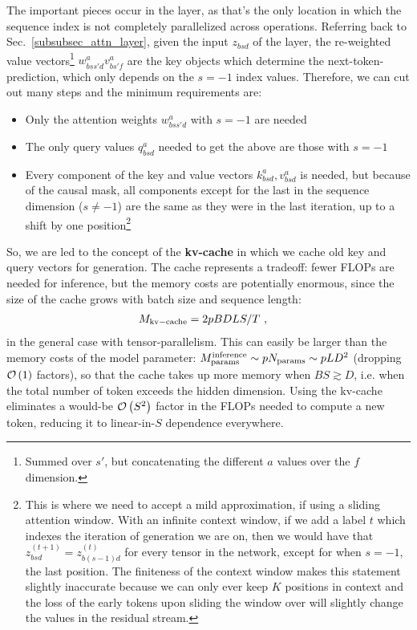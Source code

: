 The important pieces occur in the  layer, as that's the only location in
which the sequence index is not completely parallelized across operations. Referring back to
Sec.~\ref{subsubsec_attn_layer}, given the input $ z _{ bsd } $ of the 
layer, the re-weighted value vectors\footnote{Summed over $ s' $, but concatenating the different $
		a $ values over the $ f $ dimension.} $ w ^{ a }_{ bss'd } v ^{ a } _{ bs'f } $ are the key objects
which determine the next-token-prediction, which only depends on the $ s=-1 $ index values.
Therefore, we can cut out many steps and the minimum requirements are:
\begin{itemize}
	\item Only the attention weights $ w ^{ a }_{ bss'd }$ with $ s=-1 $ are needed
	\item The only query values $ q ^{ a }_{ bsd } $ needed to get the above are those with $ s=-1 $
	\item Every component of the key and value vectors $k ^{ a }_{ bsd }, v ^{ a }_{ bsd } $ is
          needed, but because of the causal mask, all components except for the last in the sequence
          dimension ($ s\neq -1 $) are the same as they were in the last iteration, up to a shift by
          one position\footnote{This is where we need to accept a mild approximation, if using a
              sliding attention window. With an infinite context window, if we add a label $ t $
              which indexes the iteration of generation we are on, then we would have that $ z ^{
              (t+1) } _{ bsd } = z ^{ (t)} _{ b (s-1)d } $ for every tensor in the network, except
              for when $ s=-1 $, the last position. The finiteness of the context window makes this
              statement slightly inaccurate because we can only ever keep $ K $ positions in context
              and the loss of the early tokens upon sliding the window over will slightly change the
          values in the residual stream.}
\end{itemize}

So, we are led to the concept of the \textbf{kv-cache} in which we cache old key and query vectors for generation.
The cache represents a tradeoff: fewer FLOPs are needed for inference, but the memory costs are potentially
enormous, since the size of the cache grows with batch size and sequence length:
\begin{align}
	M _{ {\rm kv-cache}  } & = 2pBDLS /T\ ,  \label{eq_kv_cache_memory}
\end{align}
in the general case with tensor-parallelism. This can easily be larger than the memory costs of the
model parameter: $ M _{ {\rm params}  } ^{ {\rm  inference}  } \sim p N _{ {\rm params}  } \sim p LD
^{ 2 }  $ (dropping $ \mathcal{O} \left( 1 \right)  $ factors), so that the cache takes up more memory
when $ BS \gtrsim D $, i.e. when the total number of token exceeds the hidden dimension. Using the
kv-cache eliminates a would-be $ \mathcal{O} \left( S ^{ 2 } \right)  $ factor in the FLOPs needed to
compute a new token, reducing it to linear-in-$ S $ dependence everywhere.

